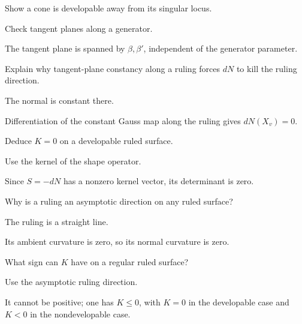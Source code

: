 \begin{exercise}\label{exr:vii18-08}
Show a cone is developable away from its singular locus.
\end{exercise}
\begin{hint}
Check tangent planes along a generator.
\end{hint}
\begin{solution}
The tangent plane is spanned by \(\beta,\beta'\), independent of the generator parameter.
\end{solution}

\begin{exercise}\label{exr:vii18-09}
Explain why tangent-plane constancy along a ruling forces \(dN\) to kill the ruling direction.
\end{exercise}
\begin{hint}
The normal is constant there.
\end{hint}
\begin{solution}
Differentiation of the constant Gauss map along the ruling gives \(dN(X_v)=0\).
\end{solution}

\begin{exercise}\label{exr:vii18-10}
Deduce \(K=0\) on a developable ruled surface.
\end{exercise}
\begin{hint}
Use the kernel of the shape operator.
\end{hint}
\begin{solution}
Since \(S=-dN\) has a nonzero kernel vector, its determinant is zero.
\end{solution}

\begin{exercise}\label{exr:vii18-11}
Why is a ruling an asymptotic direction on any ruled surface?
\end{exercise}
\begin{hint}
The ruling is a straight line.
\end{hint}
\begin{solution}
Its ambient curvature is zero, so its normal curvature is zero.
\end{solution}

\begin{exercise}\label{exr:vii18-12}
What sign can \(K\) have on a regular ruled surface?
\end{exercise}
\begin{hint}
Use the asymptotic ruling direction.
\end{hint}
\begin{solution}
It cannot be positive; one has \(K\le0\), with \(K=0\) in the developable case and \(K<0\) in the nondevelopable case.
\end{solution}

